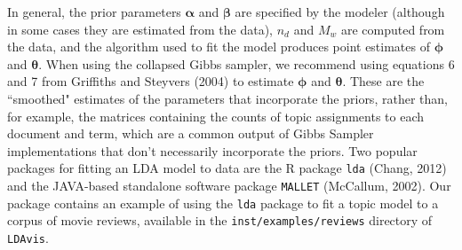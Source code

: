 \documentclass[12pt]{article}
\begin{document}
In general, the prior parameters $\boldsymbol\alpha$ and $\boldsymbol\beta$ are specified by the modeler (although in some cases they are estimated from the data), $n_d$ and $M_w$ are computed from the data, and the algorithm used to fit the model produces point estimates of $\boldsymbol\phi$ and $\boldsymbol\theta$. When using the collapsed Gibbs sampler, we recommend using equations 6 and 7 from Griffiths and Steyvers (2004) to estimate $\boldsymbol\phi$ and $\boldsymbol\theta$. These are the ``smoothed" estimates of the parameters that incorporate the priors, rather than, for example, the matrices containing the counts of topic assignments to each document and term, which are a common output of Gibbs Sampler implementations that don't necessarily incorporate the priors. Two popular packages for fitting an LDA model to data are the R package \texttt{lda} (Chang, 2012) and the JAVA-based standalone software package \texttt{MALLET} (McCallum, 2002). Our package contains an example of using the \texttt{lda} package to fit a topic model to a corpus of movie reviews, available in the \texttt{inst/examples/reviews} directory of \texttt{LDAvis}.


\end{document}
